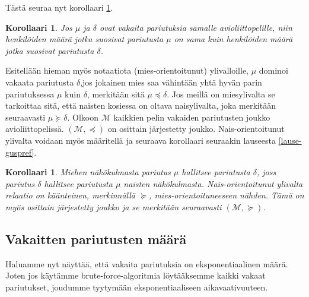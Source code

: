 \documentclass[finnish]{tktltiki2}
\newtheorem{kor}[lau]{Korollaari}
\theoremstyle{definition}
\theoremstyle{remark}
\begin{document}
Tästä seuraa nyt korollaari \ref{eqkor}.

\begin{kor}\cite[s. 18]{gusfield1989stable}\label{eqkor}
Jos $\mu$ ja $\delta$ ovat vakaita pariutuksia samalle avioliittopelille, niin henkilöiden määrä jotka suosivat pariutusta $\mu$ on sama kuin henkilöiden määrä jotka suosivat pariutusta $\delta$.
\end{kor}

Esitellään hieman myös notaatiota (mies-orientoitunut) ylivalloille,  $\mu$ dominoi vakaata pariutusta $\delta$,jos jokainen mies saa vähintään yhtä hyvän parin pariutuksessa $\mu$ kuin $\delta$, merkitään sitä $\mu \preceq \delta$.
Jos meillä on miesylivalta se tarkoittaa sitä, että naisten kosiessa on oltava naisylivalta, joka merkitään seuraavasti $\mu \succeq \delta$. Olkoon $\mathcal{M}$ kaikkien pelin vakaiden pariutusten joukko avioliittopelissä. $(\mathcal{M}, \preceq)$ on osittain järjestetty joukko.
Nais-orientoitunut ylivalta voidaan myös määritellä ja seuraava korollaari seuraakin lauseesta \ref{lause-guspref}.

\begin{kor}\cite[s. 19]{gusfield1989stable}
Miehen näkökulmasta pariutus $\mu$ hallitsee pariutusta $\delta$, joss pariutus $\delta$ hallitsee pariutusta $\mu$ naisten näkökulmasta. \emph{Nais-orientoitunut} ylivalta relaatio on käänteinen, merkinnällä $\succeq$, mies-orientoituneeseen nähden. Tämä on myös osittain järjestetty joukko ja se merkitään seuraavasti $(\mathcal{M}, \succeq)$. 
\end{kor}

\subsection{Vakaitten pariutusten määrä}
Haluamme nyt näyttää, että vakaita pariutuksia on eksponentiaalinen määrä. Joten jos käytämme brute-force-algoritmia löytääksemme kaikki vakaat pariutukset, joudumme tyytymään eksponentiaaliseen aikavaativuuteen.
\end{document}
